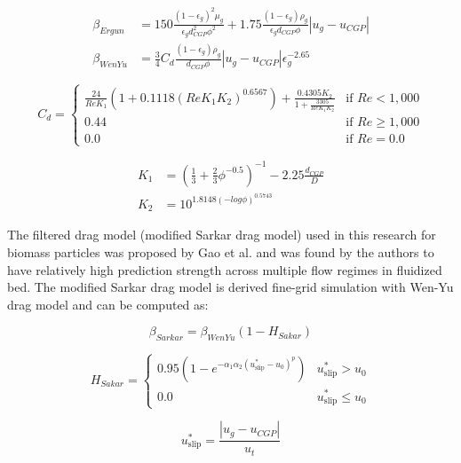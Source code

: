 \begin{align}
    \beta_{Ergun} &= 150 \frac{(1 - \epsilon_g)^2 \mu_g}{\epsilon_g d^2_{CGP} \phi^2} + 1.75 \frac{(1 - \epsilon_g) \rho_g}{\epsilon_g d_{CGP} \phi} |u_g - u_{CGP}| \\
    \beta_{WenYu} &= \frac{3}{4} C_d \frac{(1 - \epsilon_g) \rho_g}{d_{CGP} \phi} |u_g - u_{CGP}| \epsilon_g^{-2.65}
\end{align}

\begin{equation}
    C_d =
    \begin{cases}
        \frac{24}{Re K_1} (1 + 0.1118(Re K_1 K_2)^{0.6567}) + \frac{0.4305 K_2}{1 + \frac{3305}{Re K_1 K_2}} & \text{if } Re < 1,000 \\
        0.44 & \text{if } Re \geq 1,000 \\
        0.0 & \text{if } Re = 0.0
    \end{cases}
\end{equation}

\begin{align}
    K_1 &= \left(\frac{1}{3} + \frac{2}{3} \phi^{-0.5} \right)^{-1} - 2.25 \frac{d_{CGP}}{D} \\
    K_2 &= 10^{1.8148 (-log \phi)^{0.5743}}
\end{align}

The filtered drag model (modified Sarkar drag model) used in this research for biomass particles was proposed by Gao et al. \cite{Gao-2018} and was found by the authors to have relatively high prediction strength across multiple flow regimes in fluidized bed. The modified Sarkar drag model is derived fine-grid simulation with Wen-Yu drag model and can be computed as:

\begin{equation}
    \beta_{Sarkar} = \beta_{WenYu} (1 - H_{Sakar})
\end{equation}

\begin{equation}
    H_{Sakar} =
    \begin{cases}
        0.95 \left(1 - e^{-\alpha_1 \alpha_2 (u_{\text{slip}}^* - u_0)^p} \right) & u_{\text{slip}}^* > u_0 \\
        0.0 & u_{\text{slip}}^* \leq u_0
    \end{cases}
\end{equation}

\begin{equation}
    u_{\text{slip}}^* = \frac{|u_g - u_{CGP}|}{u_t}
\end{equation}

